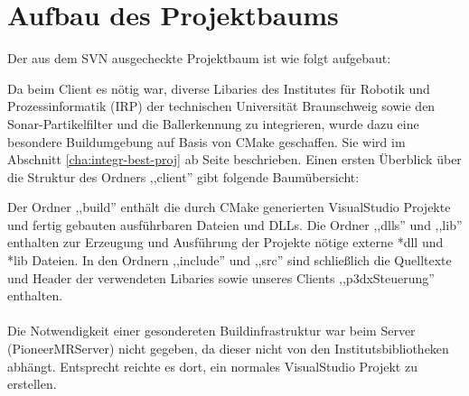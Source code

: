 
\section{Aufbau des Projektbaums}
\label{sec:aufbau_projektbaum}
Der aus dem SVN ausgecheckte Projektbaum  ist wie folgt aufgebaut:\\
Da beim Client es nötig war, diverse Libaries des Institutes für
Robotik und Prozessinformatik (IRP) der technischen Universität
Braunschweig sowie den Sonar-Partikelfilter und die Ballerkennung zu
integrieren, wurde dazu eine besondere Buildumgebung auf Basis von
CMake geschaffen. Sie
wird im Abschnitt \ref{cha:integr-best-proj} ab Seite
\pageref{cha:integr-best-proj} beschrieben. Einen ersten Überblick
über die Struktur des Ordners ,,client'' gibt folgende Baumübersicht:\\
Der Ordner ,,build'' enthält die durch CMake generierten VisualStudio
Projekte und fertig gebauten ausführbaren Dateien und DLLs. Die Ordner
,,dlls'' und ,,lib'' enthalten zur Erzeugung und Ausführung der
Projekte nötige externe *dll und *lib Dateien. In den Ordnern
,,include'' und ,,src'' sind schließlich die Quelltexte und Header der
verwendeten Libaries sowie unseres Clients ,,p3dxSteuerung''
enthalten. \\\\
Die Notwendigkeit einer gesondereten Buildinfrastruktur war beim
Server (PioneerMRServer) nicht 
gegeben, da dieser nicht von den Institutsbibliotheken
abhängt. Entsprecht reichte es dort, ein normales VisualStudio Projekt
zu erstellen. 

